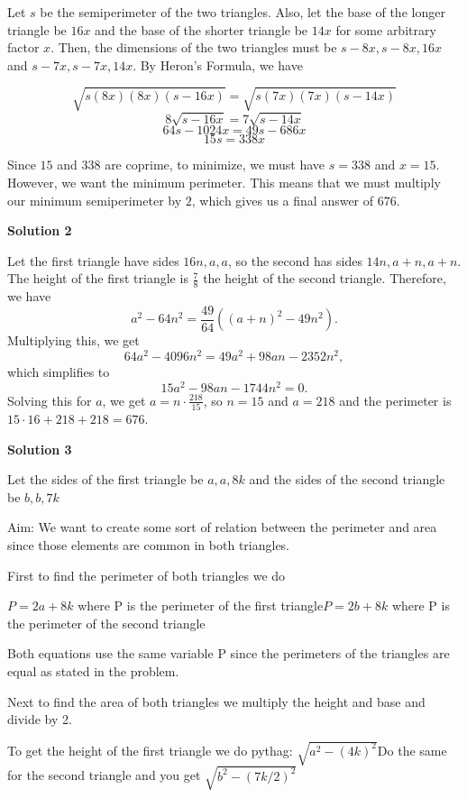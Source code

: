 \begin{enumerate}
Let $s$ be the semiperimeter of the two triangles. Also, let the base of the longer triangle be $16x$ and the base of the shorter triangle be $14x$ for some arbitrary factor $x$. Then, the dimensions of the two triangles must be $s-8x,s-8x,16x$ and $s-7x,s-7x,14x$. By Heron's Formula, we have 

 
 \[\sqrt{s(8x)(8x)(s-16x)}=\sqrt{s(7x)(7x)(s-14x)}\]
 \[8\sqrt{s-16x}=7\sqrt{s-14x}\]
 \[64s-1024x=49s-686x\]
 \[15s=338x\]

 

 Since $15$ and $338$ are coprime, to minimize, we must have $s=338$ and $x=15$. However, we want the minimum perimeter. This means that we must multiply our minimum semiperimeter by $2$, which gives us a final answer of $\boxed{676}$.

 



\textbf{Solution 2}

Let the first triangle have sides $16n,a,a$, so the second has sides $14n,a+n,a+n$. The height of the first triangle is $\frac{7}{8}$ the height of the second triangle. Therefore, we have 
 \[a^2-64n^2=\frac{49}{64}((a+n)^2-49n^2).\] Multiplying this, we get 
 \[64a^2-4096n^2=49a^2+98an-2352n^2,\] which simplifies to 
 \[15a^2-98an-1744n^2=0.\] Solving this for $a$, we get $a=n\cdot\frac{218}{15}$, so $n=15$ and $a=218$ and the perimeter is $15\cdot16+218+218=\boxed{676}$.

 


 



\textbf{Solution 3}

Let the sides of the first triangle be ${a, a, 8k}$ and the sides of the second triangle be ${b, b, 7k}$

 Aim: We want to create some sort of relation between the perimeter and area since those elements are common in both triangles.

 First to find the perimeter of both triangles we do 

 $P = 2a + 8k$ where P is the perimeter of the first triangle$P = 2b + 8k$ where P is the perimeter of the second triangle

 Both equations use the same variable P since the perimeters of the triangles are equal as stated in the problem.

 Next to find the area of both triangles we multiply the height and base and divide by 2.

 To get the height of the first triangle we do pythag: $\sqrt{a^2 - (4k)^2}$Do the same for the second triangle and you get $\sqrt{b^2 - (7k/2)^2}$


\end{enumerate}

